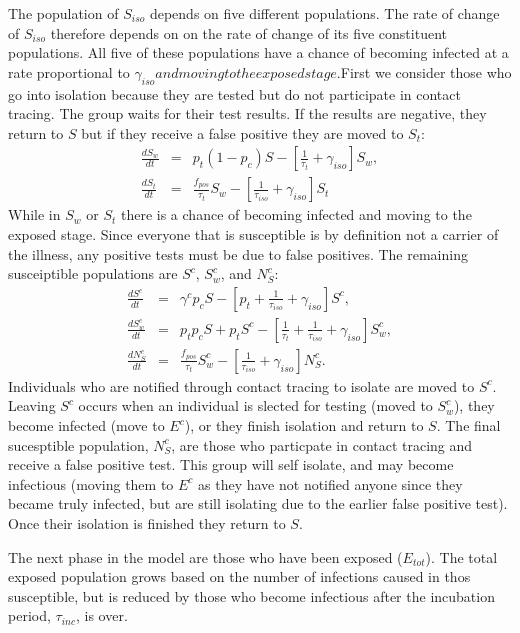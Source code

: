 \documentclass[notitlepage, superscriptaddress]{revtex4-2}
\begin{document}
The population of $S_{iso}$ depends on five different populations. The rate of change of $S_{iso}$ therefore depends on on the rate of change of its five constituent populations. All five of these populations have a chance of becoming infected at a rate proportional to $\gamma_{iso} and moving to the exposed stage. $First we consider those who go into isolation because they are tested but do not participate in contact tracing. The group waits for their test results. If the results are negative, they return to $S$ but if they receive a false positive they are moved to $S_{t}$:
\begin{eqnarray}
\label{E:dS_iso}
\frac{dS_{w}}{dt} &=& p_{t} (1 -p_{c}) S - [\frac{1}{\tau_{t}}  + \gamma_{iso}] S_{w}, \\
%
\frac{dS_{t}}{dt} &=& \frac{f_{pos}}{\tau_{t}} S_{w} - [\frac{1}{\tau_{iso}}  + \gamma_{iso}] S_{t}\end{eqnarray}
While in $S_{w}$ or $S_{t}$ there is a chance of becoming infected and moving to the exposed stage. Since everyone that is susceptible is by definition not a carrier of the illness, any positive tests must be due to false positives. The remaining susceiptible populations are $S^{c}$, $S^{c}_{w}$, and $N^{c}_{S}$:
\begin{eqnarray}
\label{E:dSc}
 \frac{dS^{c}}{dt} &=& \gamma^{c} p_{c} S -[p_{t} +\frac{1}{\tau_{iso}} +\gamma_{iso}] S^{c}, \\
 \frac{dS^{c}_{w}}{dt} &=& p_{t}p_{c} S + p_{t}S^{c} - [\frac{1}{\tau_{t}}  + \frac{1}{\tau_{iso}}  + \gamma_{iso}] S^{c}_{w}, \\ 
 \frac{dN^{c}_{S}}{dt} &=& \frac{f_{pos}}{\tau_{t}} S^{c}_{w} - [\frac{1}{\tau_{iso}}  + \gamma_{iso}] N^{c}_{S}.  
\end{eqnarray}
Individuals who are notified through contact tracing to isolate are moved to $S^{c}$. Leaving $S^{c}$ occurs when an individual is slected for testing (moved to $S^{c}_{w}$), they become infected (move to $E^{c}$), or they finish isolation and return to $S$. The final sucesptible population, $N^{c}_{S}$, are those who particpate in contact tracing and receive a false positive test. This group will self isolate, and may become infectious (moving them to $E^{c}$ as they have not notified anyone since they became truly infected, but are still isolating due to the earlier false positive test). Once their isolation is finished they return to $S$.

The next phase in the model are those who have been exposed ($E_{tot}$). The total exposed population grows based on the number of infections caused in thos susceptible, but is reduced by those who become infectious after the incubation period, $\tau_{inc}$, is over.
\end{document}
